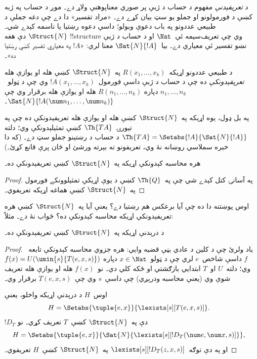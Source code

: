 \documentclass[../../../include/open-logic-section]{subfiles}
\begin{document}


د \emph{تعريفېدنې} مفهوم د حساب د ژبې پر صوري معناپوهنې ولاړ دے۔
موږ د حساب په ژبه کښې د فورمولونو او جملو يو سټ بيان کړے دے۔
«مراد تفسير» دا دے چې دغه جملې د طبيعي عددونو په باب دعوې وبولو؛
داسې دعوه رښتيا يا ناسمه کېدے شي۔ $\Struct{N}$ دې هغه
!!{structure} وي چې تعريف‌سيمه ئې~$\Nat$ او د حساب د ژبې
نښو تفسير ئې معياري دے۔ بيا~$\Sat{N}{!A}$ معنا لري: «$!A$
په معياري تفسير کښې رښتيا ده»۔

\begin{defn}
د طبيعي عددونو اړيکه~$R(x_1,\dots,x_k)$ په~$\Struct{N}$ کښې
هله او يوازې هله \emph{تعريفېدونکې} ده چې د حساب د ژبې داسې
فورمول~$!A(x_1,\dots,x_k)$ وي چې د ټولو~$n_1,\dots,n_k$ دپاره
$R(n_1,\dots,n_k)$ هله او يوازې هله برقرار وي چې
$\Sat{N}{!A(\num n_1,\dots,\num
  n_k)}$۔
\end{defn}

په بل ډول، يوه اړيکه په~$\Struct{N}$ کښې هله او يوازې هله
تعريفېدونکې ده چې په تيورۍ~$\Th{TA}$ کښې تمثيلېدونکې وي؛ دلته
$\Th{TA} =
\Setabs{!A}{\Sat{N}{!A}}$ د حساب د رښتينو جملو سټ دے۔ (که دا
خبره سملاسي روښانه نۀ وي، تعريفونو ته بېرته ورشئ او ځان پرې
قانع کړئ۔)

\begin{lem}
هره محاسبه کېدونکې اړيکه په~$\Struct{N}$ کښې تعريفېدونکې ده۔
\end{lem}

\begin{proof}
په آسانۍ کتل کېدے شي چې په~$\Th{Q}$ کښې د يوې اړيکې
تمثيلوونکے فورمول په~$\Struct{N}$ کښې هماغه اړيکه تعريفوي۔
\end{proof}

اوس پوښتنه دا ده چې آيا برعکس هم رښتيا دے؟ يعنې آيا په~$\Struct{N}$
کښې هره تعريفېدونکې اړيکه محاسبه کېدونکې ده؟ ځواب نۀ دے۔ مثلاً:

\begin{lem}
د درېدنې اړيکه په~$\Struct{N}$ کښې تعريفېدونکې ده۔
\end{lem}

\begin{proof}
ياد ولرئ چې د کلين د عادي بڼې قضيه وايي: هره جزوي محاسبه
کېدونکې تابعه~$f$ داسې شاخص~$e$ لري چې د ټولو~$x \in \Nat$
دپاره $f(x) =
U(\umin{s}{T(e,x,s)})$ وي؛ دلته~$U$ او~$T$ ابتدايي بازګشتي
او ځکه کلي دي۔ نو~$f(x)$ هله او يوازې هله تعريف شوې وي (يعنې
محاسبه ودرېږي) چې داسې~$s$ وي چې~$T(e,x,s)$ برقرار وي۔

اوس~$H$ د درېدنې اړيکه واخلو، يعنې
\[
H = \Setabs{\tuple{e,x}}{\lexists[s][T(e, x, s)]}.
\]
$!D_T$ دې په~$\Struct{N}$ کښې~$T$ تعريف کړي۔ نو
\[
H = \Setabs{\tuple{e,x}}{\Sat{N}{\lexists[s][!D_T(\num e, \num x, s)]}},
\]
او په دې توګه~$\lexists[s][!D_T(z, x, s)]$ په~$\Struct{N}$
کښې~$H$ تعريفوي۔
\end{proof}
\end{document}
